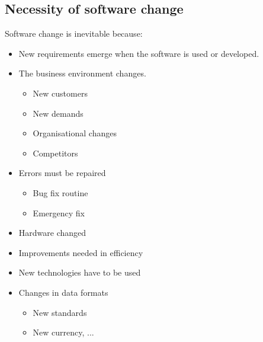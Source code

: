 \documentclass[a4paper,11pt]{report}
\begin{document}
	\subsection{Necessity of software change}
		Software change is inevitable because:
		\begin{itemize}
			\item New requirements emerge when the 
				software is used or developed.
			\item The business environment changes.
				\begin{itemize}	
					\item New customers
					\item New demands
					\item Organisational changes
					\item Competitors
				\end{itemize}
			\item Errors must be repaired
				\begin{itemize}
					\item Bug fix routine
					\item Emergency fix
				\end{itemize}
			\item Hardware changed
			\item Improvements needed in efficiency
			\item New technologies have to be used
			\item Changes in data formats
				\begin{itemize}
					\item New standards
					\item New currency, ...
				\end{itemize}
		\end{itemize}
\end{document}
